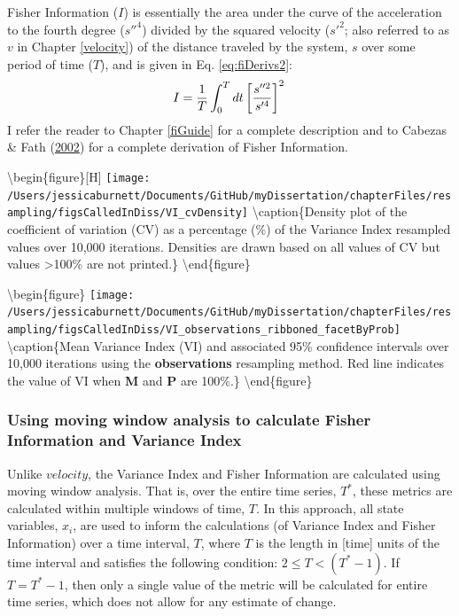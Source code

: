 \documentclass[12pt,twoside,openany]{reedthesis}
\begin{document}
Fisher Information (\(I\)) is essentially the area under the curve of the acceleration to the fourth degree (\(s''^4\)) divided by the squared velocity (\(s'^2\); also referred to as \(v\) in Chapter \ref{velocity}) of the distance traveled by the system, \(s\) over some period of time (\(T\)), and is given in Eq. \eqref{eq:fiDerivs2}:
\begin{equation}   
    I = \frac{1}{T} \int_0^T dt\left[\frac{s''^2}{s'^4}\right]^2 \\  
  \label{eq:fiDerivs2}  
\end{equation}
I refer the reader to Chapter \ref{fiGuide} for a complete description and to Cabezas \& Fath (\protect\hyperlink{ref-cabezas_towards_2002}{2002}) for a complete derivation of Fisher Information.

\textbackslash begin\{figure\}{[}H{]}
\texttt{[image: /Users/jessicaburnett/Documents/GitHub/myDissertation/chapterFiles/resampling/figsCalledInDiss/VI\_cvDensity]} \textbackslash caption\{Density plot of the coefficient of variation (CV) as a percentage (\%) of the Variance Index resampled values over 10,000 iterations. Densities are drawn based on all values of CV but values \textgreater100\% are not printed.\}\label{fig:viCV}
\textbackslash end\{figure\}

\textbackslash begin\{figure\}
\texttt{[image: /Users/jessicaburnett/Documents/GitHub/myDissertation/chapterFiles/resampling/figsCalledInDiss/VI\_observations\_ribboned\_facetByProb]} \textbackslash caption\{Mean Variance Index (VI) and associated 95\% confidence intervals over 10,000 iterations using the \textbf{observations} resampling method. Red line indicates the value of VI when \textbf{M} and \textbf{P} are 100\%.\}\label{fig:viResamp}
\textbackslash end\{figure\}

\hypertarget{using-moving-window-analysis-to-calculate-fisher-information-and-variance-index}{%
\subsubsection{Using moving window analysis to calculate Fisher Information and Variance Index}\label{using-moving-window-analysis-to-calculate-fisher-information-and-variance-index}}

Unlike \(velocity\), the Variance Index and Fisher Information are calculated using moving window analysis. That is, over the entire time series, \(T^*\), these metrics are calculated within multiple windows of time, \(T\). In this approach, all state variables, \(x_i\), are used to inform the calculations (of Variance Index and Fisher Information) over a time interval, \(T\), where \(T\) is the length in {[}time{]} units of the time interval and satisfies the following condition: \(2\leq T < (T^*-1)\). If \(T = T^*-1\), then only a single value of the metric will be calculated for entire time series, which does not allow for any estimate of change.
\end{document}
